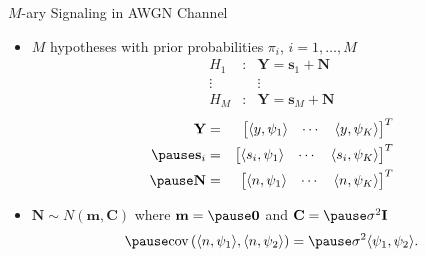 \documentclass[t]{beamer}
\begin{document}
\begin{frame}{$M$-ary Signaling in AWGN Channel}
  \footnotesize
  \begin{itemize}
    \item $M$ hypotheses with prior probabilities $\pi_i$, $i=1,\ldots,M$
      \begin{equation*}
        \begin{array}{ccc}
            H_1 & : & \mathbf{Y} = \mathbf{s}_1 + \mathbf{N} \\
            \vdots &   &  \vdots          \\
            H_M & : & \mathbf{Y} = \mathbf{s}_M + \mathbf{N}
        \end{array}
      \end{equation*}
      \pause
      \begin{eqnarray*}
        \mathbf{Y} & = & \begin{bmatrix} \langle y, \psi_1 \rangle & \cdots & \langle y, \psi_K \rangle \end{bmatrix}^T \\
        \pause
        \mathbf{s}_i & = & \begin{bmatrix} \langle s_i, \psi_1 \rangle & \cdots & \langle s_i, \psi_K \rangle \end{bmatrix}^T \\
        \pause
        \mathbf{N} & = & \begin{bmatrix} \langle n, \psi_1 \rangle & \cdots & \langle n, \psi_K \rangle \end{bmatrix}^T
      \end{eqnarray*}
    \item \pause $\mathbf{N} \sim N(\mathbf{m}, \mathbf{C})$ \pause where $\mathbf{m} = \pause \mathbf{0}$ and $\mathbf{C} = \pause \sigma^2 \mathbf{I}$
      \begin{equation*}
        \pause \text{cov}\left( \langle n, \psi_1 \rangle, \langle n, \psi_2 \rangle \right) = \pause \sigma^2 \langle \psi_1, \psi_2 \rangle.
      \end{equation*}
  \end{itemize}
  \normalsize
\end{frame}
\end{document}
